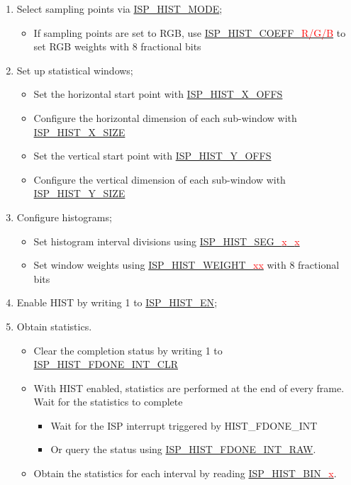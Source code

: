 \documentclass[main\_\_EN.tex]{subfiles}
\begin{document}
\begin{enumerate}
    \item Select sampling points via \hyperref[fielddesc:ISPHISTMODE]{ISP\_HIST\_MODE};
    \begin{itemize}
        \item If sampling points are set to RGB, use \hyperref[fielddesc:ISPHISTCOEFFR]{ISP\_HIST\_COEFF\_\textcolor{red}{R/G/B}} to set RGB weights with 8 fractional bits
    \end{itemize}

    \item Set up statistical windows;
    \begin{itemize}
        \item Set the horizontal start point with \hyperref[fielddesc:ISPHISTXOFFS]{ISP\_HIST\_X\_OFFS}
        \item Configure the horizontal dimension of each sub-window with \hyperref[fielddesc:ISPHISTXSIZE]{ISP\_HIST\_X\_SIZE}
        \item Set the vertical start point with \hyperref[fielddesc:ISPHISTYOFFS]{ISP\_HIST\_Y\_OFFS}
        \item Configure the vertical dimension of each sub-window with \hyperref[fielddesc:ISPHISTYSIZE]{ISP\_HIST\_Y\_SIZE}
    \end{itemize}

    \item Configure histograms;
    \begin{itemize}
        \item Set histogram interval divisions using \hyperref[fielddesc:ISPHISTSEG01]{ISP\_HIST\_SEG\_\textcolor{red}{x}\_\textcolor{red}{x}}
        \item Set window weights using \hyperref[fielddesc:ISPHISTWEIGHT00]{ISP\_HIST\_WEIGHT\_\textcolor{red}{xx}} with 8 fractional bits
    \end{itemize}

    \item Enable HIST by writing 1 to \hyperref[fielddesc:ISPHISTEN]{ISP\_HIST\_EN};

    \item Obtain statistics.
    \begin{itemize}
        \item Clear the completion status by writing 1 to \hyperref[fielddesc:ISPHISTFDONEINTCLR]{ISP\_HIST\_FDONE\_INT\_CLR}
        \item With HIST enabled, statistics are performed at the end of every frame. Wait for the statistics to complete
        \begin{itemize}
            \item Wait for the ISP interrupt triggered by HIST\_FDONE\_INT
            \item Or query the status using \hyperref[fielddesc:ISPHISTFDONEINTRAW]{ISP\_HIST\_FDONE\_INT\_RAW}.
        \end{itemize}
        \item Obtain the statistics for each interval by reading \hyperref[fielddesc:ISPHISTBIN0]{ISP\_HIST\_BIN\_\textcolor{red}{x}}.
    \end{itemize}
\end{enumerate}
\end{document}
